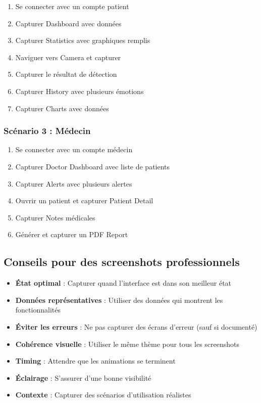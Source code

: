 \documentclass[a4paper,11pt]{report}
\begin{document}
\begin{enumerate}
    \item Se connecter avec un compte patient
    \item Capturer Dashboard avec données
    \item Capturer Statistics avec graphiques remplis
    \item Naviguer vers Camera et capturer
    \item Capturer le résultat de détection
    \item Capturer History avec plusieurs émotions
    \item Capturer Charts avec données
\end{enumerate}

\subsubsection{Scénario 3 : Médecin}

\begin{enumerate}
    \item Se connecter avec un compte médecin
    \item Capturer Doctor Dashboard avec liste de patients
    \item Capturer Alerts avec plusieurs alertes
    \item Ouvrir un patient et capturer Patient Detail
    \item Capturer Notes médicales
    \item Générer et capturer un PDF Report
\end{enumerate}

\subsection{Conseils pour des screenshots professionnels}

\begin{itemize}
    \item \textbf{État optimal} : Capturer quand l'interface est dans son meilleur état
    \item \textbf{Données représentatives} : Utiliser des données qui montrent les fonctionnalités
    \item \textbf{Éviter les erreurs} : Ne pas capturer des écrans d'erreur (sauf si documenté)
    \item \textbf{Cohérence visuelle} : Utiliser le même thème pour tous les screenshots
    \item \textbf{Timing} : Attendre que les animations se terminent
    \item \textbf{Éclairage} : S'assurer d'une bonne visibilité
    \item \textbf{Contexte} : Capturer des scénarios d'utilisation réalistes
\end{itemize}
\end{document}
